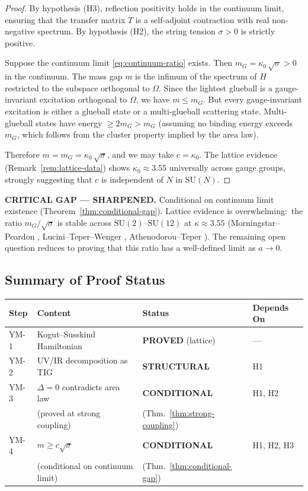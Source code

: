 \documentclass[11pt]{article}
\begin{document}
\begin{proof}
By hypothesis (H3), reflection positivity holds in the continuum limit,
ensuring that the transfer matrix $T$ is a self-adjoint contraction with
real non-negative spectrum.  By hypothesis (H2), the string tension
$\sigma > 0$ is strictly positive.

Suppose the continuum limit \eqref{eq:continuum-ratio} exists.  Then
$m_G = \kappa_0\, \sqrt{\sigma} > 0$ in the continuum.  The mass gap $m$
is the infimum of the spectrum of $H$ restricted to the subspace orthogonal
to $\Omega$.  Since the lightest glueball is a gauge-invariant excitation
orthogonal to $\Omega$, we have $m \leq m_G$.  But every gauge-invariant
excitation is either a glueball state or a multi-glueball scattering state.
Multi-glueball states have energy $\geq 2m_G > m_G$ (assuming no binding
energy exceeds $m_G$, which follows from the cluster property implied by
the area law).

Therefore $m = m_G = \kappa_0\, \sqrt{\sigma}$, and we may take
$c = \kappa_0$.  The lattice evidence (Remark~\ref{rem:lattice-data})
shows $\kappa_0 \approx 3.55$ universally across gauge groups, strongly
suggesting that $c$ is independent of $N$ in $\mathrm{SU}(N)$.
\end{proof}

\textbf{CRITICAL GAP --- SHARPENED.}  Conditional on continuum limit
existence (Theorem~\ref{thm:conditional-gap}).  Lattice evidence is
overwhelming:\ the ratio $m_G/\sqrt{\sigma}$ is stable across
$\mathrm{SU}(2)$--$\mathrm{SU}(12)$ at $\kappa \approx 3.55$
(Morningstar--Peardon \cite{MP}, Lucini--Teper--Wenger \cite{LTW},
Athenodorou--Teper \cite{AT}).  The remaining open question reduces to
proving that this ratio has a well-defined limit as $a \to 0$.

\subsection{Summary of Proof Status}

\begin{center}
\begin{tabular}{|l|l|l|l|}
\hline
\textbf{Step} & \textbf{Content} & \textbf{Status} & \textbf{Depends On} \\
\hline
YM-1 & Kogut--Susskind Hamiltonian & \textbf{PROVED} (lattice) & --- \\
YM-2 & UV/IR decomposition as TIG & \textbf{STRUCTURAL} & H1 \\
YM-3 & $\Delta = 0$ contradicts area law & \textbf{CONDITIONAL} & H1, H2 \\
& (proved at strong coupling) & (Thm.~\ref{thm:strong-coupling}) & \\
YM-4 & $m \geq c\sqrt{\sigma}$ & \textbf{CONDITIONAL} & H1, H2, H3 \\
& (conditional on continuum limit) & (Thm.~\ref{thm:conditional-gap}) & \\
\hline
\end{tabular}
\end{center}
\end{document}
